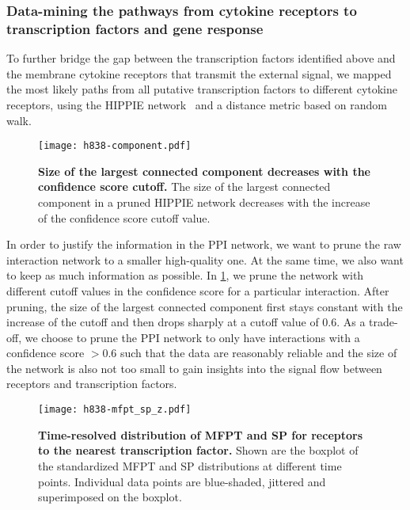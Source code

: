 \subsubsection{Data-mining the pathways from cytokine receptors to transcription factors and gene response}

To further bridge the gap between the transcription factors identified above and the membrane cytokine receptors that 
transmit the external signal,
we mapped the most likely paths from all putative 
transcription factors to different cytokine receptors, 
using the HIPPIE network~\citep{Schaefer2012} and a 
distance metric based on random walk.

\begin{figure}[!ht]
\begin{center}
\texttt{[image: h838-component.pdf]}
\end{center}
\caption[Confidence score cutoff]{
{\bf Size of the largest connected component decreases with the confidence
score cutoff.} 
The size of the largest connected component in a pruned HIPPIE network decreases
with the increase of the confidence score cutoff value.
}
\label{fig:h838_component}
\end{figure}

In order to justify the information in the PPI network, we want to prune the
raw interaction network to a smaller
high-quality one. At the same time, we also want to keep as 
much information as possible. In \ref{fig:h838_component}, we prune the 
network with different cutoff values in the confidence score for a particular
interaction. After pruning, the
size of the largest connected component first stays constant with the increase 
of the cutoff and then drops
sharply at a cutoff value of 0.6. As a trade-off, we choose to prune the PPI network
to only have interactions with a confidence score $>0.6$ such that the data
are reasonably reliable and the size of the network is also not too small to
gain insights into the signal flow between receptors and transcription factors.

\begin{figure}[!ht]
\begin{center}
\texttt{[image: h838-mfpt\_sp\_z.pdf]}
\end{center}
\caption[MFPT and SP distribution]{
{\bf Time-resolved distribution of MFPT and SP for receptors to the 
nearest transcription factor.} 
Shown are the boxplot of the standardized MFPT and SP distributions at 
different time points. Individual data points are blue-shaded, jittered
and superimposed on the boxplot.
}
\label{fig:h838_mfpt_sp}
\end{figure}

